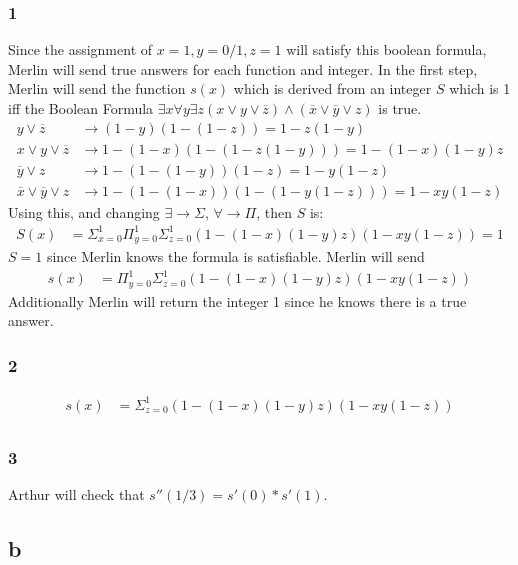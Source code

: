 \documentclass[letterpaper,notitlepage,twoside]{article}
\begin{document}
\subsubsection*{1}
Since the assignment of $x=1,y=0/1,z=1$ will satisfy this boolean formula, Merlin will send true answers for each function and integer. In the first step, Merlin will send the function $s(x)$ which is derived from an integer $S$ which is 1 iff the Boolean Formula $\exists x \forall y \exists z ( x \lor y \lor \overline{z}) \land (\overline{x} \lor \overline{y} \lor z)$ is true.
\begin{align*}
y \lor \overline{z} &\rightarrow (1 - y)(1 - (1 - z)) = 1 - z(1 - y)\\
x \lor y \lor \overline{z} &\rightarrow 1 - (1 - x)(1 - (1 - z(1 - y))) = 1 - (1 - x)(1 - y)z\\
\overline{y} \lor z &\rightarrow 1 - (1 - (1 - y))(1 - z) = 1 - y(1 - z)\\
\overline{x} \lor \overline{y} \lor z &\rightarrow 1 - (1 - (1 - x))(1 - (1 - y(1 - z))) = 1 - xy(1 - z)
\end{align*}
Using this, and changing $\exists \rightarrow \Sigma$, $\forall \rightarrow \Pi$, then $S$ is:
\begin{align*}
S(x)&=\Sigma_{x = 0}^1\Pi_{y = 0}^1\Sigma_{z = 0}^1 (1 - (1 - x)(1 - y)z)(1 - xy(1 - z)) = 1
\end{align*}
$S=1$ since Merlin knows the formula is satisfiable. Merlin will send
\begin{align*}
s(x)&=\Pi_{y = 0}^1\Sigma_{z = 0}^1 (1 - (1 - x)(1 - y)z)(1 - xy(1 - z))
\end{align*}
Additionally Merlin will return the integer 1 since he knows there is a true answer.

\subsubsection*{2}
\begin{align*}
s(x)&=\Sigma_{z = 0}^1 (1 - (1 - x)(1 - y)z)(1 - xy(1 - z)) \\
\end{align*}

\subsubsection*{3}
Arthur will check that $s''(1/3) = s'(0) * s'(1)$.

\subsection*{b}
\end{document}
